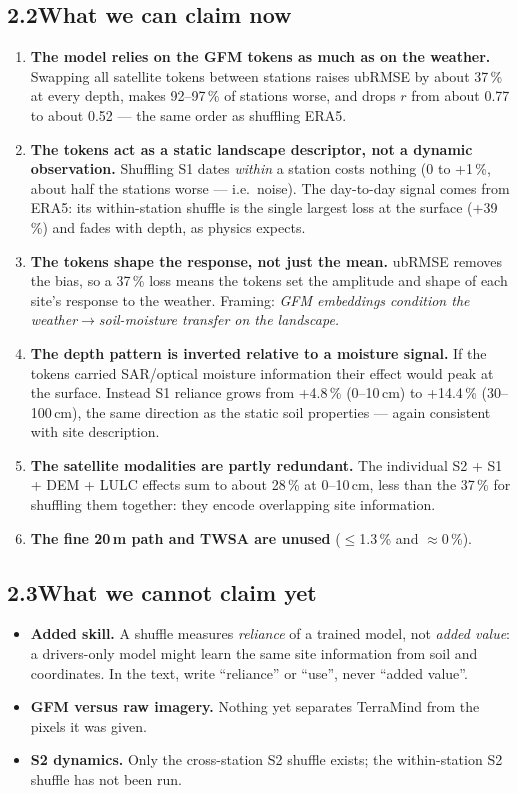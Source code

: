 \documentclass[11pt,a4paper]{article}
\begin{document}
\subsection*{2.2\quad What we can claim now}

\begin{enumerate}
\item \textbf{The model relies on the GFM tokens as much as on the weather.} Swapping all satellite
      tokens between stations raises ubRMSE by about 37\,\% at every depth, makes 92--97\,\% of
      stations worse, and drops $r$ from about 0.77 to about 0.52 --- the same order as shuffling ERA5.
\item \textbf{The tokens act as a static landscape descriptor, not a dynamic observation.}
      Shuffling S1 dates \emph{within} a station costs nothing (0 to +1\,\%, about half the stations
      worse --- i.e.\ noise). The day-to-day signal comes from ERA5: its within-station shuffle is the
      single largest loss at the surface (+39\,\%) and fades with depth, as physics expects.
\item \textbf{The tokens shape the response, not just the mean.} ubRMSE removes the bias, so a
      37\,\% loss means the tokens set the amplitude and shape of each site's response to the weather.
      Framing: \emph{GFM embeddings condition the weather$\rightarrow$soil-moisture transfer on the landscape.}
\item \textbf{The depth pattern is inverted relative to a moisture signal.} If the tokens carried
      SAR/optical moisture information their effect would peak at the surface. Instead S1 reliance grows
      from +4.8\,\% (0--10\,cm) to +14.4\,\% (30--100\,cm), the same direction as the static soil
      properties --- again consistent with site description.
\item \textbf{The satellite modalities are partly redundant.} The individual S2 + S1 + DEM + LULC
      effects sum to about 28\,\% at 0--10\,cm, less than the 37\,\% for shuffling them together: they encode
      overlapping site information.
\item \textbf{The fine 20\,m path and TWSA are unused} ($\le$1.3\,\% and $\approx$0\,\%).
\end{enumerate}

\subsection*{2.3\quad What we cannot claim yet}

\begin{itemize}
\item \textbf{Added skill.} A shuffle measures \emph{reliance} of a trained model, not \emph{added value}:
      a drivers-only model might learn the same site information from soil and coordinates.
      In the text, write ``reliance'' or ``use'', never ``added value''.
\item \textbf{GFM versus raw imagery.} Nothing yet separates TerraMind from the pixels it was given.
\item \textbf{S2 dynamics.} Only the cross-station S2 shuffle exists; the within-station S2 shuffle has not been run.
\end{itemize}
\end{document}
